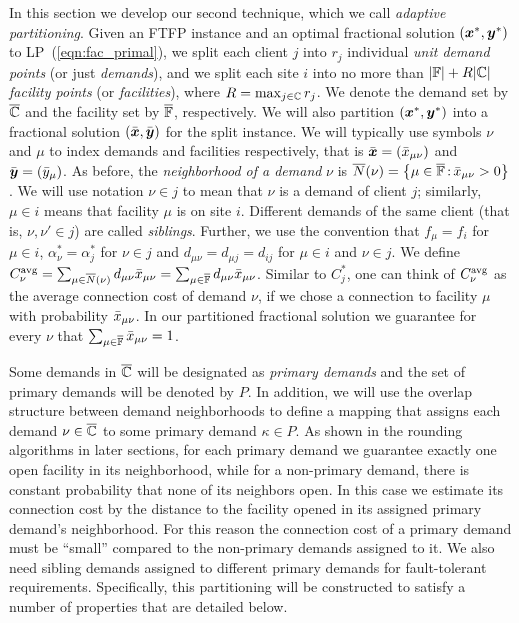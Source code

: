 \documentclass[11pt]{article}
\begin{document}
In this section we develop our second technique, which we
call \emph{adaptive partitioning}. Given an FTFP instance
and an optimal fractional solution $(\boldsymbol{x}^\ast, \boldsymbol{y}^\ast)$
to LP~(\ref{eqn:fac_primal}), we split each client $j$ into
$r_j$ individual \emph{unit demand points} (or just
\emph{demands}), and we split each site $i$ into no more
than $|\mathbb{F}|+R|\mathbb{C}|$ \emph{facility points} (or
\emph{facilities}), where $R=\max_{j\in\mathbb{C}}r_j$. We
denote the demand set by $\overline{\mathbb{C}}$ and the facility set
by $\overline{\mathbb{F}}$, respectively.  We will also partition
$(\boldsymbol{x}^\ast,\boldsymbol{y}^\ast)$ into a fractional solution
$(\bar{\boldsymbol{x}},\bar{\boldsymbol{y}})$ for the split instance.  We will
typically use symbols $\nu$ and $\mu$ to index demands and
facilities respectively, that is $\bar{\boldsymbol{x}} =
({\bar x}_{\mu\nu})$ and $\bar{\boldsymbol{y}} = ({\bar y}_{\mu})$.  As before,
the \emph{neighborhood of a demand} $\nu$ is
${\overline{N}}(\nu)={ \left\{ \mu\in\overline{\mathbb{F}} {\,:\,}
  {\bar x}_{\mu\nu}>0 \right\} }$.  We will use notation $\nu\in j$ to
mean that $\nu$ is a demand of client $j$; similarly,
$\mu\in i$ means that facility $\mu$ is on site
$i$. Different demands of the same client (that is,
$\nu,\nu'\in j$) are called \emph{siblings}.  Further, we
use the convention that $f_\mu = f_i$ for $\mu\in i$,
$\alpha_\nu^\ast = \alpha_j^\ast$ for $\nu\in j$ and
$d_{\mu\nu} = d_{\mu j} = d_{ij}$ for $\mu\in i$ and $\nu\in
j$.  We define $C^{{\mbox{\scriptsize\rm avg}}}_{\nu}
=\sum_{\mu\in{\overline{N}}(\nu)}d_{\mu\nu}{\bar x}_{\mu\nu} =
\sum_{\mu\in\overline{\mathbb{F}}}d_{\mu\nu}{\bar x}_{\mu\nu}$.  Similar
to $C^\ast_j$, one can think of $C^{{\mbox{\scriptsize\rm avg}}}_{\nu}$ as the
average connection cost of demand $\nu$, if we chose a
connection to facility $\mu$ with probability
${\bar x}_{\mu\nu}$. In our partitioned fractional solution we
guarantee for every $\nu$ that $\sum_{\mu\in\overline{\mathbb{F}}}
{\bar x}_{\mu\nu}=1$.

Some demands in $\overline{\mathbb{C}}$ will be designated as
\emph{primary demands} and the set of primary demands will
be denoted by $P$. In addition, we will use the overlap
structure between demand neighborhoods to define a mapping
that assigns each demand $\nu\in\overline{\mathbb{C}}$ to some primary
demand $\kappa\in P$. As shown in the rounding algorithms in
later sections, for each primary demand we guarantee exactly
one open facility in its neighborhood, while for a
non-primary demand, there is constant probability that none
of its neighbors open. In this case we estimate its
connection cost by the distance to the facility opened in
its assigned primary demand's neighborhood. For this reason
the connection cost of a primary demand must be ``small''
compared to the non-primary demands assigned to it. We also
need sibling demands assigned to different primary demands
for fault-tolerant requirements. Specifically, this
partitioning will be constructed to satisfy a number of
properties that are detailed below.
%
\end{document}
